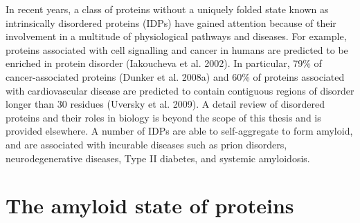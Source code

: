 In recent years, a class of proteins without a uniquely folded state known as intrinsically disordered proteins (IDPs) have gained attention because of their involvement in a multitude of physiological pathways and diseases.  For example, proteins associated with cell signalling and cancer in humans are predicted to be enriched in protein disorder (Iakoucheva et al. 2002). In particular, 79\% of cancer-associated proteins (Dunker et al. 2008a) and 60\% of proteins associated with cardiovascular disease are predicted to contain contiguous regions of disorder longer than 30 residues (Uversky et al. 2009).
A detail review of disordered proteins and their roles in biology is beyond the scope of this thesis and is provided elsewhere.\cite{Rauscher:2010p5682,Uversky:2008gh} A number of IDPs are able to self-aggregate to form amyloid, and are associated with incurable diseases such as prion disorders, neurodegenerative diseases, Type II diabetes, and systemic amyloidosis. 




\section{The amyloid state of proteins}
\label{sec:amyloid}

